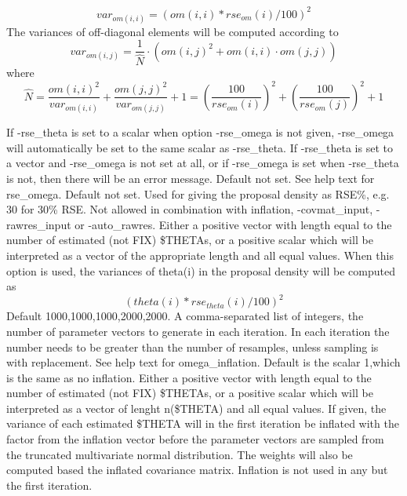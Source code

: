 \begin{optionlist}
\[
var_{om(i,i)}=\left(om(i,i)*rse_{om}(i)/100\right)^2
\]
The variances of off-diagonal elements will be computed according to
\[
var_{om(i,j)}= \frac{1}{\hat{N}} \cdot \left(om(i,j)^2 + om(i,i)\cdot om(j,j) \right)
\]
where
\[
\hat{N} = \frac{om(i,i)^2}{var_{om(i,i)}}+\frac{om(j,j)^2}{var_{om(j,j)}}+1 =\left(\frac{100}{rse_{om}(i)}\right)^2+\left(\frac{100}{rse_{om}(j)}\right)^2+1
\]

If -rse\_theta is set to a scalar when option -rse\_omega is not given, -rse\_omega will automatically be set to the same scalar as -rse\_theta. If -rse\_theta is set to a vector and -rse\_omega is not set at all, or if -rse\_omega is set when -rse\_theta is not, then there will be an error message.
\nextopt
{}
Default not set. See help text for rse\_omega.
\nextopt
{}
Default not set. Used for giving the proposal density as RSE\%, e.g. 30 for 30\% RSE. Not allowed in combination with inflation, -covmat\_input, -rawres\_input or -auto\_rawres. Either a positive vector with length equal to the number of estimated (not FIX) \$THETAs, or a positive scalar which will be interpreted as a vector of the appropriate length and all equal values. When this option is used, the variances of theta(i) in the proposal density will be computed as
\[
\left(theta(i)*rse_{theta}(i)/100\right)^2
\]
\nextopt
{}
Default 1000,1000,1000,2000,2000. A comma-separated list of integers, the number of parameter vectors to generate in each iteration. In each iteration the number needs to be greater than the number of resamples, unless sampling is with replacement.
\nextopt
{}
See help text for omega\_inflation.
\nextopt
{}
Default is the scalar 1,which is the same as no inflation. Either a positive vector with length equal to the number of estimated (not FIX) \$THETAs, or a positive scalar which will be interpreted as a vector of lenght n(\$THETA) and all equal values.
If given, the variance of each estimated \$THETA will in the first iteration be inflated with the factor from the inflation vector before the parameter vectors are sampled from the truncated multivariate normal distribution. The weights will also be computed based the inflated covariance matrix. Inflation is not used in any but the first iteration.
\nextopt
\nextopt
\end{optionlist}
